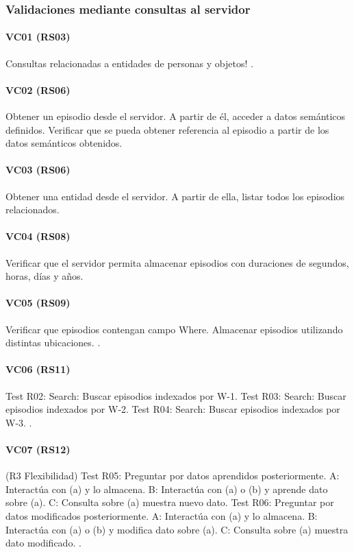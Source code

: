 \subsubsection{Validaciones mediante consultas al servidor}

\paragraph{VC01 (RS03)}
Consultas relacionadas a entidades de personas y objetos!
.


\paragraph{VC02 (RS06)}
Obtener un episodio desde el servidor. A partir de él, acceder a datos semánticos definidos. Verificar que se pueda obtener referencia al episodio a partir de los datos semánticos obtenidos.

\paragraph{VC03 (RS06)}
Obtener una entidad desde el servidor. A partir de ella, listar todos los episodios relacionados.

\paragraph{VC04 (RS08)}
Verificar que el servidor permita almacenar episodios con duraciones de segundos, horas, días y años.

\paragraph{VC05 (RS09)}
Verificar que episodios contengan campo Where. Almacenar episodios utilizando distintas ubicaciones.
.


\paragraph{VC06 (RS11)}
Test R02: Search: Buscar episodios indexados por W-1.
Test R03: Search: Buscar episodios indexados por W-2.
Test R04: Search: Buscar episodios indexados por W-3.
.


\paragraph{VC07 (RS12)}
(R3 Flexibilidad)
Test R05: Preguntar por datos aprendidos posteriormente.
A: Interactúa con (a) y lo almacena.
B: Interactúa con (a) o (b) y aprende dato sobre (a).
C: Consulta sobre (a) muestra nuevo dato.
Test R06: Preguntar por datos modificados posteriormente.
A: Interactúa con (a) y lo almacena.
B: Interactúa con (a) o (b) y modifica dato sobre (a).
C: Consulta sobre (a) muestra dato modificado.
.

